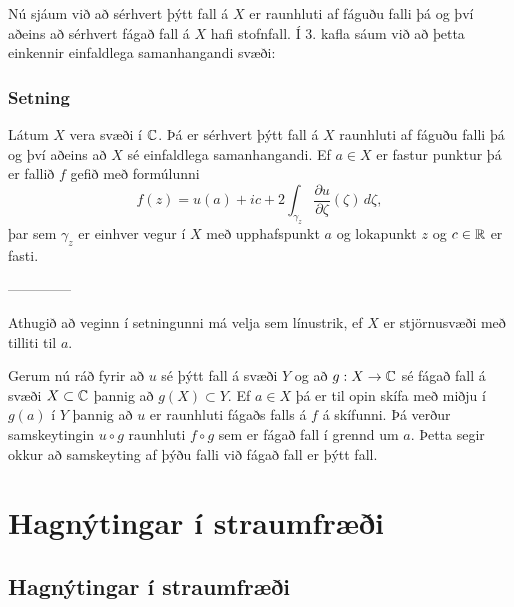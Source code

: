 Nú sjáum við að sérhvert þýtt fall á $X$ er raunhluti af fáguðu falli
þá og því aðeins að sérhvert fágað fall á $X$ hafi stofnfall. Í
3. kafla  sáum við að  þetta einkennir einfaldlega samanhangandi
svæði:

\subsubsection{Setning}  Látum $X$ vera svæði í ${\mathbb C}$.  Þá er sérhvert þýtt fall á
$X$ raunhluti af fáguðu falli þá og því aðeins að $X$ sé einfaldlega
samanhangandi.   Ef $a\in X$ er fastur punktur þá er fallið
$f$ gefið með formúlunni
$$
f(z)=u(a)+ic+2\int_{\gamma_z} \dfrac{\partial u}{\partial
\zeta}(\zeta) \, d\zeta,
$$
þar sem $\gamma_z$ er einhver vegur í $X$ með upphafspunkt $a$ og
lokapunkt $z$ og $c\in {\mathbb R}$ er fasti.


--------------




Athugið að veginn í setningunni má velja sem línustrik, ef 
$X$ er stjörnusvæði með tilliti til $a$.

\medskip
Gerum nú ráð fyrir að $u$ sé þýtt fall á svæði $Y$ og að 
$g:X\to {\mathbb C}$ sé fágað fall á svæði $X\subset {\mathbb C}$ þannig að 
$g(X)\subset Y$.  Ef $a\in  X$ þá er til opin skífa með miðju í 
$g(a)$ í $Y$ þannig að $u$ er raunhluti fágaðs falls á 
$f$ á skífunni.  Þá verður samskeytingin $u\circ g$ raunhluti 
$f\circ g$ sem er fágað fall í grennd um $a$.  Þetta segir okkur að
samskeyting af þýðu falli við fágað fall er þýtt fall.
 

\section{Hagnýtingar í straumfræði}

\subsection{Hagnýtingar í straumfræði}  


